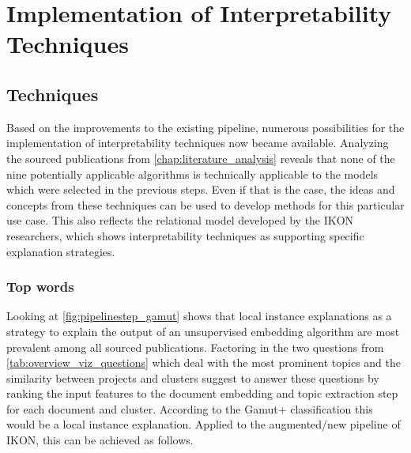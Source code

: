 %
\chapter{Implementation of Interpretability Techniques}
\label{chap:interpretability_techniques}

\section{Techniques}

Based on the improvements to the existing pipeline, numerous possibilities for the implementation of interpretability techniques now became available.
Analyzing the sourced publications from \autoref{chap:literature_analysis} reveals that none of the nine potentially applicable algorithms is technically applicable to the models which were selected in the previous steps. Even if that is the case, the ideas and concepts from these techniques can be used to develop methods for this particular use case. This also reflects the relational model developed by the IKON researchers, which shows interpretability techniques as supporting specific explanation strategies.

\subsection{Top words}

Looking at \autoref{fig:pipelinestep_gamut} shows that local instance explanations as a strategy to explain the output of an unsupervised embedding algorithm are most prevalent among all sourced publications. Factoring in the two questions from \autoref{tab:overview_viz_questions} which deal with the most prominent topics and the similarity between projects and clusters suggest to answer these questions by ranking the input features to the document embedding and topic extraction step for each document and cluster. According to the Gamut+ classification this would be a local instance explanation. Applied to the augmented/new pipeline of IKON, this can be achieved as follows.

